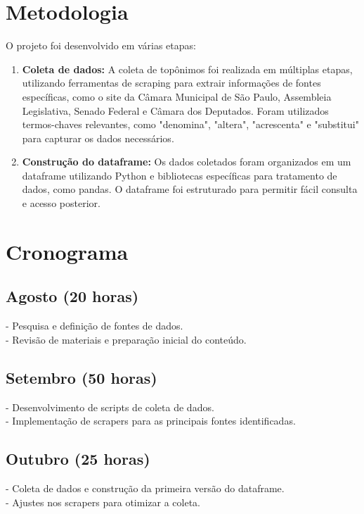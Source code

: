 \documentclass{article}
\begin{document}
\section*{Metodologia}
O projeto foi desenvolvido em várias etapas:
\begin{enumerate}
    \item \textbf{Coleta de dados:} A coleta de topônimos foi realizada em múltiplas etapas, utilizando ferramentas de scraping para extrair informações de fontes específicas, como o site da Câmara Municipal de São Paulo, Assembleia Legislativa, Senado Federal e Câmara dos Deputados. Foram utilizados termos-chaves relevantes, como "denomina", "altera", "acrescenta" e "substitui" para capturar os dados necessários.
    \item \textbf{Construção do dataframe:} Os dados coletados foram organizados em um dataframe utilizando Python e bibliotecas específicas para tratamento de dados, como pandas. O dataframe foi estruturado para permitir fácil consulta e acesso posterior.
\end{enumerate}

\section*{Cronograma}
\subsection*{Agosto (20 horas)}
- Pesquisa e definição de fontes de dados.\\
- Revisão de materiais e preparação inicial do conteúdo.\\

\subsection*{Setembro (50 horas)}
- Desenvolvimento de scripts de coleta de dados.\\
- Implementação de scrapers para as principais fontes identificadas.\\

\subsection*{Outubro (25 horas)}
- Coleta de dados e construção da primeira versão do dataframe.\\
- Ajustes nos scrapers para otimizar a coleta.\\
\end{document}
